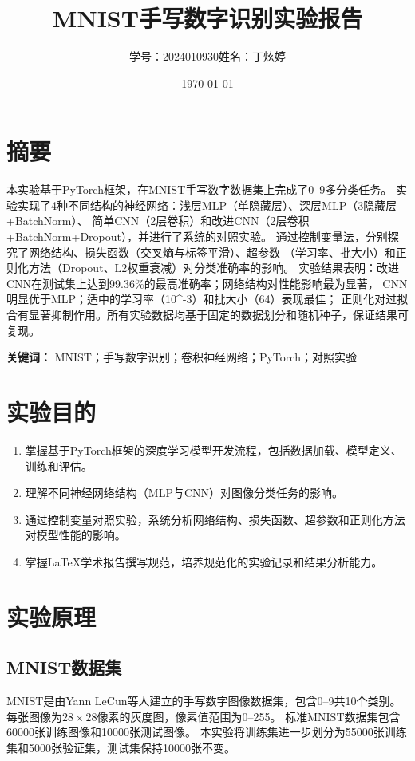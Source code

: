 \documentclass[12pt,a4paper]{article}
\title{\textbf{MNIST手写数字识别实验报告}}
\author{学号：2024010930\quad 姓名：丁炫婷}
\date{\today}
\begin{document}
\maketitle
\thispagestyle{empty}
\newpage

\section*{摘\quad 要}
本实验基于PyTorch框架，在MNIST手写数字数据集上完成了0--9多分类任务。
实验实现了4种不同结构的神经网络：浅层MLP（单隐藏层）、深层MLP（3隐藏层+BatchNorm）、
简单CNN（2层卷积）和改进CNN（2层卷积+BatchNorm+Dropout），并进行了系统的对照实验。
通过控制变量法，分别探究了网络结构、损失函数（交叉熵与标签平滑）、超参数
（学习率、批大小）和正则化方法（Dropout、L2权重衰减）对分类准确率的影响。
实验结果表明：改进CNN在测试集上达到99.36\%的最高准确率；网络结构对性能影响最为显著，
CNN明显优于MLP；适中的学习率（10^{-3}）和批大小（64）表现最佳；
正则化对过拟合有显著抑制作用。所有实验数据均基于固定的数据划分和随机种子，保证结果可复现。

\vspace{0.5cm}
\textbf{关键词：} MNIST；手写数字识别；卷积神经网络；PyTorch；对照实验

\newpage
\tableofcontents
\newpage

\section{实验目的}
\begin{enumerate}
    \item 掌握基于PyTorch框架的深度学习模型开发流程，包括数据加载、模型定义、训练和评估。
    \item 理解不同神经网络结构（MLP与CNN）对图像分类任务的影响。
    \item 通过控制变量对照实验，系统分析网络结构、损失函数、超参数和正则化方法对模型性能的影响。
    \item 掌握LaTeX学术报告撰写规范，培养规范化的实验记录和结果分析能力。
\end{enumerate}

\section{实验原理}

\subsection{MNIST数据集}
MNIST是由Yann LeCun等人建立的手写数字图像数据集，包含0--9共10个类别。
每张图像为$28\times28$像素的灰度图，像素值范围为0--255。
标准MNIST数据集包含60000张训练图像和10000张测试图像。
本实验将训练集进一步划分为55000张训练集和5000张验证集，测试集保持10000张不变。
\end{document}
